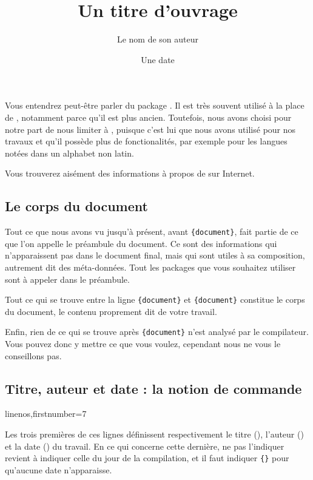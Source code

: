 \begin{plusloins}
Vous entendrez peut-être parler du package . Il est très souvent utilisé à la place de , notamment parce qu'il est plus ancien. Toutefois, nous avons choisi pour notre part de nous limiter à , puisque c'est lui que nous avons utilisé pour nos travaux et qu'il possède plus de fonctionalités, par exemple pour les langues notées dans un alphabet non latin.

Vous trouverez aisément des informations à propos de  sur Internet.

\end{plusloins}

\subsection{Le corps du document}

Tout ce que nous avons vu jusqu'à présent, avant  \verb|{document}|, fait partie de ce que l'on appelle le préambule du document.\label{preambule} Ce sont des informations qui n'apparaissent pas dans le document final, mais qui sont utiles à sa composition, autrement dit des méta-données. Tout les packages que vous souhaitez utiliser sont à appeler dans le préambule.

Tout ce qui se trouve entre la ligne \verb|{document}| et \verb|{document}| constitue le corps du document, le contenu proprement dit de votre travail.

Enfin, rien de ce qui se trouve après \verb|{document}| n'est analysé par le compilateur. Vous pouvez donc y mettre ce que vous voulez, cependant nous ne vous le conseillons pas.

\subsection{Titre, auteur et date : la notion de commande}\label{notioncommande}

\begin{latexcode*}{linenos,firstnumber=7}
\title{Un titre d'ouvrage}
\author{Le nom de son auteur}
\date{Une date}
\maketitle
\end{latexcode*}

Les trois premières de ces lignes définissent respectivement le titre (), l'auteur () et la date () du travail. En ce qui concerne cette dernière, ne pas l'indiquer revient à indiquer  celle du jour de la compilation, et il faut indiquer \verb|{}| pour qu'aucune date n'apparaisse.

